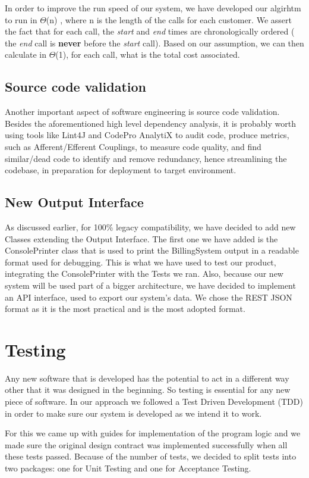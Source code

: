 \documentclass[11pt,twocolumn]{article} %
\begin{document}
In order to improve the run speed of our system, we have developed our algirhtm to run in $\Theta$(n)
, where n is the length of the calls for each customer. We assert the fact that for each call,
the \textit{start} and \textit{end} times are chronologically ordered ( the \textit{end} call is \textbf{never}
before the \textit{start} call). Based on our assumption, we can then calculate in $\Theta$(1), for each call,
what is the total cost associated. 

\subsection{Source code validation}
Another important aspect of software engineering is source code validation. Besides the
aforementioned high level dependency analysis, it is probably worth using tools like Lint4J
and CodePro AnalytiX to audit code, produce metrics, such as Afferent/Efferent Couplings, to measure code quality, and find similar/dead code to identify and remove redundancy, hence streamlining the codebase, in preparation for deployment to target environment.


\subsection{New Output Interface}
As discussed earlier, for 100\% legacy compatibility, we have decided to add new Classes extending the Output Interface. 
The first one we have added is the ConsolePrinter class that is used to print the BillingSystem output in a readable 
format used for debugging. This is what we have used to test our product, integrating the ConsolePrinter with the Tests we ran. 
Also, because our new system will be used part of a bigger architecture, we have decided to implement an API interface, 
used to export our system's data. We chose the REST JSON format as it is the most practical and is the most adopted format.

\section{Testing}
Any new software that is developed has the potential to act in a different way other that it was designed in the beginning. So testing is essential for any new piece of software.
In our approach we followed a Test Driven Development (TDD) in order to make sure our system is developed as we intend it to work. 

For this we came up with guides for implementation of the program logic and we made sure the original design contract was implemented successfully when all these tests passed.            
Because of the number of tests, we decided to split tests into two packages: one for Unit Testing and one for Acceptance Testing.
\end{document}
